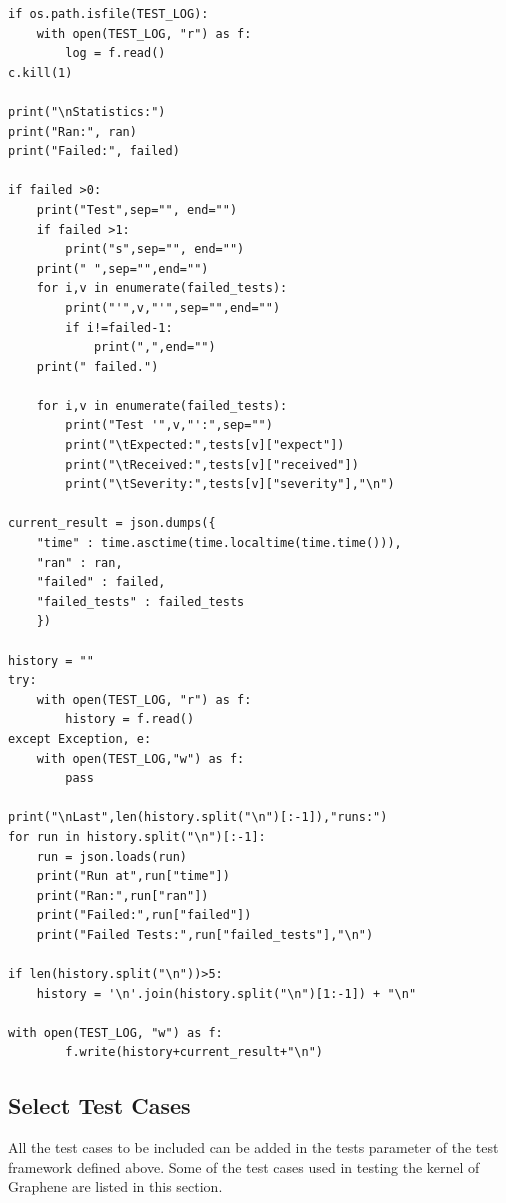 \documentclass[a4paper]{article}
\begin{document}
\begin{verbatim}
if os.path.isfile(TEST_LOG):
    with open(TEST_LOG, "r") as f:
        log = f.read()
c.kill(1)

print("\nStatistics:")
print("Ran:", ran)
print("Failed:", failed)

if failed >0:
    print("Test",sep="", end="")
    if failed >1:
        print("s",sep="", end="")
    print(" ",sep="",end="")
    for i,v in enumerate(failed_tests):
        print("'",v,"'",sep="",end="")
        if i!=failed-1:
            print(",",end="")
    print(" failed.")

    for i,v in enumerate(failed_tests):
        print("Test '",v,"':",sep="")
        print("\tExpected:",tests[v]["expect"])
        print("\tReceived:",tests[v]["received"])
        print("\tSeverity:",tests[v]["severity"],"\n")

current_result = json.dumps({
    "time" : time.asctime(time.localtime(time.time())),
    "ran" : ran,
    "failed" : failed,
    "failed_tests" : failed_tests
    })

history = ""
try:
    with open(TEST_LOG, "r") as f:
        history = f.read()
except Exception, e:
    with open(TEST_LOG,"w") as f:
        pass

print("\nLast",len(history.split("\n")[:-1]),"runs:")
for run in history.split("\n")[:-1]:
    run = json.loads(run)
    print("Run at",run["time"])
    print("Ran:",run["ran"])
    print("Failed:",run["failed"])
    print("Failed Tests:",run["failed_tests"],"\n")

if len(history.split("\n"))>5:
    history = '\n'.join(history.split("\n")[1:-1]) + "\n"

with open(TEST_LOG, "w") as f:
        f.write(history+current_result+"\n")
\end{verbatim}
    
\subsection{Select Test Cases}
All the test cases to be included can be added in the tests parameter of the test framework defined above. Some of the test cases used in testing the kernel of Graphene are listed in this section.
\end{document}
